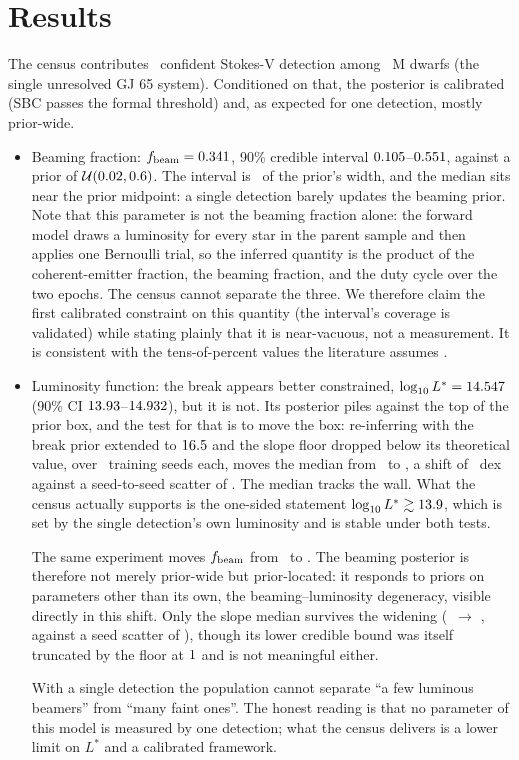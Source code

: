\documentclass[twocolumn]{aastex631}
\begin{document}
\section{Results}
\label{sec:results}
The census contributes \svbRealNDet\ confident Stokes-V detection among \svbRealNTargets\ M dwarfs
(the single unresolved GJ 65 system). Conditioned on that, the posterior is calibrated
(SBC passes the formal threshold) and, as expected for one detection, mostly prior-wide.
\begin{itemize}
\item Beaming fraction: $f_{\rm beam} = 0.341$, 90\% credible interval
$0.105$--$0.551$, against a prior of
$\mathcal{U}(0.02, 0.6)$. The interval is
\svbRealFbeamWidthRatio\ of the prior's width, and the median sits near the prior midpoint: a
single detection barely updates the beaming prior. Note that this parameter is not the beaming
fraction alone: the forward model draws a luminosity for every star in the parent sample and
then applies one Bernoulli trial, so the inferred quantity is the product of the
coherent-emitter fraction, the beaming fraction, and the duty cycle over the two epochs.
The census cannot separate the three. We therefore claim the first calibrated constraint on
this quantity (the interval's coverage is validated) while stating plainly that it is
near-vacuous, not a measurement. It is consistent with the tens-of-percent values the
literature assumes \citep{callingham2021,pritchard2021}.
\item Luminosity function: the break appears better constrained,
$\log_{10}L^* = 14.547$ (90\% CI $13.93$--$14.932$), but
it is not. Its posterior piles against the top of the prior box, and the test for that is to
move the box: re-inferring with the break prior extended to $16.5$ and the slope
floor dropped below its theoretical value, over \svbPriorNSeeds\ training seeds each, moves the
median from \svbPriorLogLPub\ to \svbPriorLogLWide, a shift of \svbPriorLogLShift\ dex
against a seed-to-seed scatter of \svbPriorLogLSeedSd. The median tracks the wall. What the
census actually supports is the one-sided statement $\log_{10}L^* \gtrsim 13.9$, which
is set by the single detection's own luminosity and is stable under both tests.

The same experiment moves $f_{\rm beam}$ from \svbPriorFbeamPub\ to \svbPriorFbeamWide. The
beaming posterior is therefore not merely prior-wide but prior-located: it responds to priors
on parameters other than its own, the beaming--luminosity degeneracy, visible directly in this
shift. Only the slope median survives the widening (\svbPriorSlopePub\ $\to$
\svbPriorSlopeWide, against a seed scatter of \svbPriorSlopeSeedSd), though its lower credible
bound was itself truncated by the floor at $1$ and is not meaningful either.

With a single detection the population cannot separate ``a few luminous beamers'' from ``many
faint ones''. The honest reading is that no parameter of this model is measured by one
detection; what the census delivers is a lower limit on $L^*$ and a calibrated framework.
\end{itemize}
\end{document}
